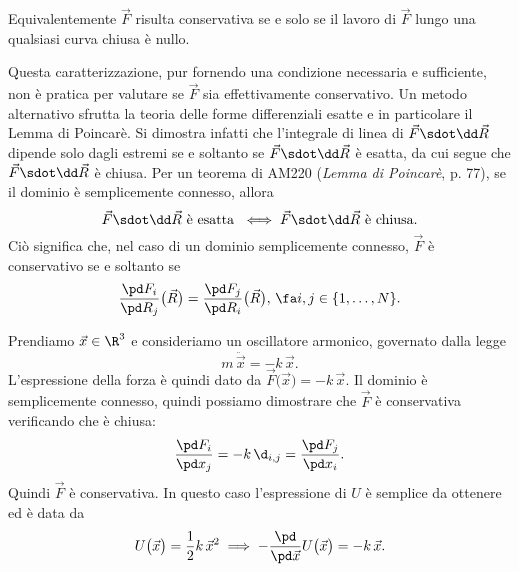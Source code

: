 \begin{oss}
	Equivalentemente \(\vec{F}\) risulta conservativa se e solo se il lavoro di \(\vec{F}\) lungo una qualsiasi curva chiusa è nullo.
\end{oss}

Questa caratterizzazione, pur fornendo una condizione necessaria e sufficiente, non è pratica per valutare se \(\vec{F}\) sia effettivamente conservativo.
Un metodo alternativo sfrutta la teoria delle forme differenziali esatte e in particolare il Lemma di Poincarè.
Si dimostra infatti che l'integrale di linea di \(\vec{F}\sdot\dd\vec{R}\) dipende solo dagli estremi se e soltanto se \(\vec{F}\sdot\dd\vec{R}\) è esatta, da cui segue che \(\vec{F}\sdot\dd\vec{R}\) è chiusa.
Per un teorema di AM220 (\emph{Lemma di Poincarè}, p. 77), se il dominio è semplicemente connesso, allora
\[
	\vec{F}\sdot\dd\vec{R} \text{ è esatta }\iff \vec{F}\sdot\dd\vec{R} \text{ è chiusa}.
\]
Ciò significa che, nel caso di un dominio semplicemente connesso, \(\vec{F}\) è conservativo se e soltanto se
\[
	\frac{\pd F_i}{\pd R_j}\big(\vec{R}\big) = \frac{\pd F_j}{\pd R_i}\big(\vec{R}\big),\,\fa i,j\in\{1,\ldots,N\}.
\]

\begin{ese}
	Prendiamo \(\vec{x}\in\R^3\) e consideriamo un oscillatore armonico, governato dalla legge
	\[
		m\,\ddot{\vec{x}} = -k\,\vec{x}.
	\]
	L'espressione della forza è quindi dato da \(\vec{F}\big(\vec{x}\big)=-k\,\vec{x}\).
	Il dominio è semplicemente connesso, quindi possiamo dimostrare che \(\vec{F}\) è conservativa verificando che è chiusa:
	\[
		\frac{\pd F_i}{\pd x_j} = -k\,\d_{i,j} = \frac{\pd F_j}{\pd x_i}.
	\]
	Quindi \(\vec{F}\) è conservativa. In questo caso l'espressione di \(U\) è semplice da ottenere ed è data da
	\[
		U\big(\vec{x}\big) = \frac{1}{2}k\,\vec{x}^2 \implies -\frac{\pd}{\pd\vec{x}}U\big(\vec{x}\big) = -k\,\vec{x}.
	\]
\end{ese}

